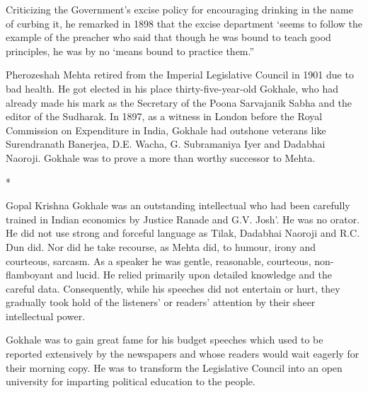Criticizing the Government’s excise policy for encouraging drinking in the name of curbing it, he remarked in 1898 that the excise department ‘seems to follow the example of the preacher who said that though he was bound to teach good principles, he was by no ‘means bound to practice them.”

Pherozeshah Mehta retired from the Imperial Legislative Council in 1901 due to bad health. He got elected in his place thirty-five-year-old Gokhale, who had already made his mark as the Secretary of the Poona Sarvajanik Sabha and the editor of the Sudharak. In 1897, as a witness in London before the Royal Commission on Expenditure in India, Gokhale had outshone veterans like Surendranath Banerjea, D.E. Wacha, G. Subramaniya Iyer and Dadabhai Naoroji. Gokhale was to prove a more than worthy successor to Mehta.

\begin{center}*\end{center}



Gopal Krishna Gokhale was an outstanding intellectual who had been carefully trained in Indian economics by Justice Ranade and G.V. Josh’. He was no orator. He did not use strong and forceful language as Tilak, Dadabhai Naoroji and R.C. Dun did. Nor did he take recourse, as Mehta did, to humour, irony and courteous, sarcasm. As a speaker he was gentle, reasonable, courteous, non-flamboyant and lucid. He relied primarily upon detailed knowledge and the careful data. Consequently, while his speeches did not entertain or hurt, they gradually took hold of the listeners’ or readers’ attention by their sheer intellectual power.

Gokhale was to gain great fame for his budget speeches which used to be reported extensively by the newspapers and whose readers would wait eagerly for their morning copy. He was to transform the Legislative Council into an open university for imparting political education to the people.

